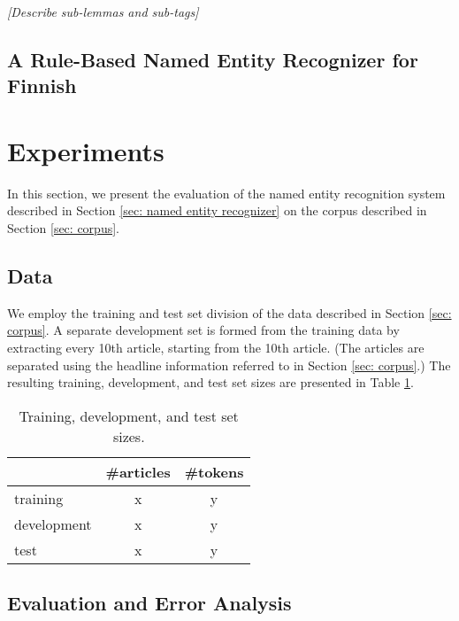 \documentclass[11pt]{article}
\newcommand{\fixme}[1]{\textsl{[#1]}}
\begin{document}
\fixme{Describe sub-lemmas and sub-tags} 



\subsection{A Rule-Based Named Entity Recognizer for Finnish}


\section{Experiments}
\label{sec: experiments}

In this section, we present the evaluation of the named entity recognition system described in Section \ref{sec: named entity recognizer} on the corpus described in Section \ref{sec: corpus}.

\subsection{Data}
\label{sec: data}

We employ the training and test set division of the data described in Section \ref{sec: corpus}. A separate development set is formed from the training data by extracting every 10th article, starting from the 10th article. (The articles are separated using the headline information referred to in Section \ref{sec: corpus}.) The resulting training, development, and test set sizes are presented in Table \ref{tab: set sizes}.

\begin{table}[t!]
\begin{center}
\begin{tabular}{lcc} 
 & \#articles & \#tokens \\
\hline
\noalign{\smallskip}
training & x & y  \\
development  & x & y  \\
test & x & y \\
\end{tabular}
\end{center}
\caption{Training, development, and test set sizes.}
\label{tab: set sizes}
\end{table}


\subsection{Evaluation and Error Analysis}
\label{sec: evaluation}
\end{document}

